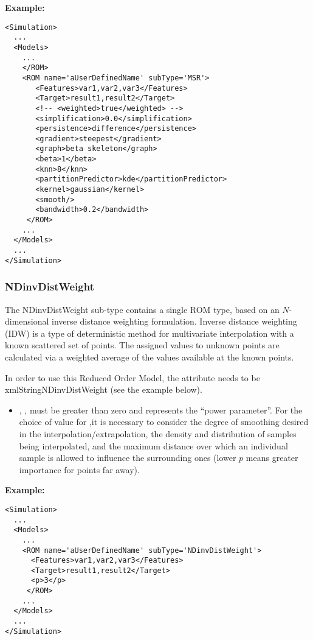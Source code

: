 
\textbf{Example:}
\begin{lstlisting}[style=XML,morekeywords={name,subType}]
<Simulation>
  ...
  <Models>
    ...
    </ROM>
    <ROM name='aUserDefinedName' subType='MSR'>
       <Features>var1,var2,var3</Features>
       <Target>result1,result2</Target>
       <!-- <weighted>true</weighted> -->
       <simplification>0.0</simplification>
       <persistence>difference</persistence>
       <gradient>steepest</gradient>
       <graph>beta skeleton</graph>
       <beta>1</beta>
       <knn>8</knn>
       <partitionPredictor>kde</partitionPredictor>
       <kernel>gaussian</kernel>
       <smooth/>
       <bandwidth>0.2</bandwidth>
     </ROM>
    ...
  </Models>
  ...
</Simulation>
\end{lstlisting}

\subsubsection{NDinvDistWeight}
\label{subsubsec:NDinvDistWeight}
The NDinvDistWeight sub-type contains a single ROM type, based on an
$N$-dimensional inverse distance weighting formulation.
%
Inverse distance weighting (IDW) is a type of deterministic method for
multivariate interpolation with a known scattered set of points.
%
The assigned values to unknown points are calculated via a weighted average of
the values available at the known points.
%

In order to use this Reduced Order Model, the  attribute
 needs to be xmlString{NDinvDistWeight} (see the example
below).
%
\subnodeIntro

\begin{itemize}
  \item {}, , must be greater than
  zero and represents the ``power parameter''.
  For the choice of value for ,it is necessary to consider the degree
  of smoothing desired in the interpolation/extrapolation, the density and
  distribution of samples being interpolated, and the maximum distance over
  which an individual sample is allowed to influence the surrounding ones (lower
  $p$ means greater importance for points far away).
\end{itemize}


\textbf{Example:}
\begin{lstlisting}[style=XML,morekeywords={name,subType}]
<Simulation>
  ...
  <Models>
    ...
    <ROM name='aUserDefinedName' subType='NDinvDistWeight'>
      <Features>var1,var2,var3</Features>
      <Target>result1,result2</Target>
      <p>3</p>
     </ROM>
    ...
  </Models>
  ...
</Simulation>
\end{lstlisting}


